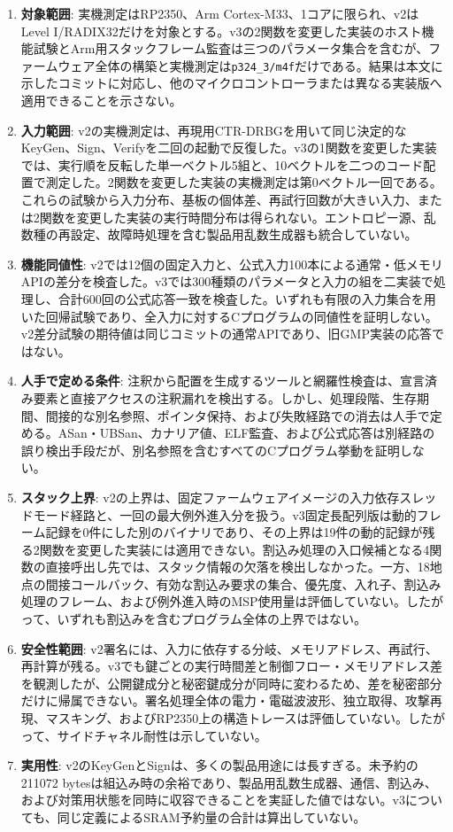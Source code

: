 \documentclass[a4paper,10pt]{ltjsarticle}
\theoremstyle{definition}
\theoremstyle{remark}
\begin{document}
\begin{enumerate}[leftmargin=2.2em]
  \item \textbf{対象範囲}: 実機測定はRP2350、Arm Cortex-M33、1コアに限られ、v2はLevel I/RADIX32だけを対象とする。v3の2関数を変更した実装のホスト機能試験とArm用スタックフレーム監査は三つのパラメータ集合を含むが、ファームウェア全体の構築と実機測定は\texttt{p324\_3/m4f}だけである。結果は本文に示したコミットに対応し、他のマイクロコントローラまたは異なる実装版へ適用できることを示さない。
  \item \textbf{入力範囲}: v2の実機測定は、再現用CTR-DRBGを用いて同じ決定的なKeyGen、Sign、Verifyを二回の起動で反復した。v3の1関数を変更した実装では、実行順を反転した単一ベクトル5組と、10ベクトルを二つのコード配置で測定した。2関数を変更した実装の実機測定は第0ベクトル一回である。これらの試験から入力分布、基板の個体差、再試行回数が大きい入力、または2関数を変更した実装の実行時間分布は得られない。エントロピー源、乱数種の再設定、故障時処理を含む製品用乱数生成器も統合していない。
  \item \textbf{機能同値性}: v2では12個の固定入力と、公式入力100本による通常・低メモリAPIの差分を検査した。v3では300種類のパラメータと入力の組を二実装で処理し、合計600回の公式応答一致を検査した。いずれも有限の入力集合を用いた回帰試験であり、全入力に対するCプログラムの同値性を証明しない。v2差分試験の期待値は同じコミットの通常APIであり、旧GMP実装の応答ではない。
  \item \textbf{人手で定める条件}: 注釈から配置を生成するツールと網羅性検査は、宣言済み要素と直接アクセスの注釈漏れを検出する。しかし、処理段階、生存期間、間接的な別名参照、ポインタ保持、および失敗経路での消去は人手で定める。ASan・UBSan、カナリア値、ELF監査、および公式応答は別経路の誤り検出手段だが、別名参照を含むすべてのCプログラム挙動を証明しない。
  \item \textbf{スタック上界}: v2の上界は、固定ファームウェアイメージの入力依存スレッドモード経路と、一回の最大例外進入分を扱う。v3固定長配列版は動的フレーム記録を0件にした別のバイナリであり、その上界は19件の動的記録が残る2関数を変更した実装には適用できない。割込み処理の入口候補となる4関数の直接呼出し先では、スタック情報の欠落を検出しなかった。一方、18地点の間接コールバック、有効な割込み要求の集合、優先度、入れ子、割込み処理のフレーム、および例外進入時のMSP使用量は評価していない。したがって、いずれも割込みを含むプログラム全体の上界ではない。
  \item \textbf{安全性範囲}: v2署名には、入力に依存する分岐、メモリアドレス、再試行、再計算が残る。v3でも鍵ごとの実行時間差と制御フロー・メモリアドレス差を観測したが、公開鍵成分と秘密鍵成分が同時に変わるため、差を秘密部分だけに帰属できない。署名処理全体の電力・電磁波波形、独立取得、攻撃再現、マスキング、およびRP2350上の構造トレースは評価していない。したがって、サイドチャネル耐性は示していない。
  \item \textbf{実用性}: v2のKeyGenとSignは、多くの製品用途には長すぎる。未予約の\num{211072} bytesは組込み時の余裕であり、製品用乱数生成器、通信、割込み、および対策用状態を同時に収容できることを実証した値ではない。v3についても、同じ定義によるSRAM予約量の合計は算出していない。
\end{enumerate}
\end{document}

